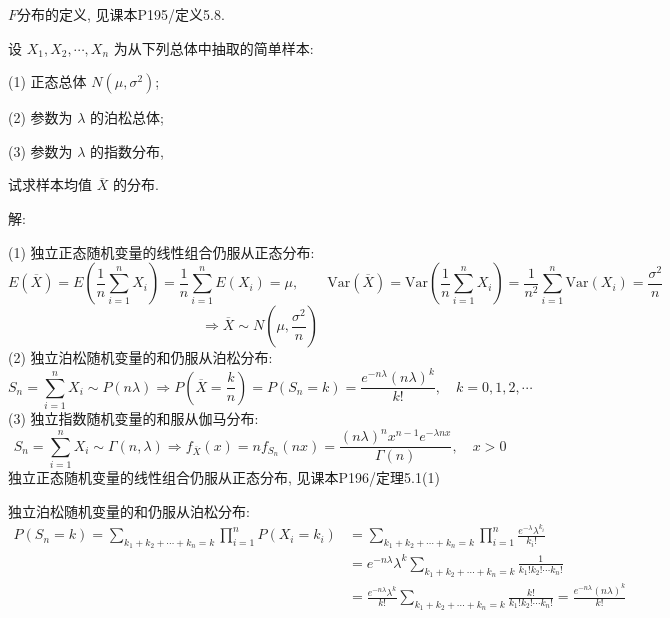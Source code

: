 \documentclass[standard]{ExBook}
\renewenvironment{shaded}{%
  \def\FrameCommand{\fboxsep=\FrameSep \colorbox{shadecolor}}%
  \MakeFramed{\advance\hsize-\width \FrameRestore}%
}{%
  \endMakeFramed
}
\begin{document}
\begin{qitems}
\textcolor{themeColor}{\selectfont {} $F$分布的定义, 见课本P195/定义5.8.}

\vspace{2.5cm-5em}

    \begin{bbox}
    \begin{shaded}
        \qitem
设 \( X_1, X_2, \cdots, X_n \) 为从下列总体中抽取的简单样本:

(1) 正态总体 \( N(\mu, \sigma^2) \);

(2) 参数为 \(\lambda\) 的泊松总体;

(3) 参数为 \(\lambda\) 的指数分布,

试求样本均值 \(\overline{X}\) 的分布.
    \end{shaded}
    \end{bbox}

\vspace{\dimexpr2.5cm-5em\relax}

解: 

(1) 独立正态随机变量的线性组合仍服从正态分布:
$$
E(\overline{X}) = E(\frac{1}{n}\sum\limits_{i=1}^{n}X_i) = \frac{1}{n}\sum\limits_{i=1}^{n}E(X_i) = \mu,
\qquad
\mathrm{Var}(\overline{X}) = \mathrm{Var}(\frac{1}{n}\sum\limits_{i=1}^{n}X_i) = \frac{1}{n^2}\sum\limits_{i=1}^{n}\mathrm{Var}(X_i) = \frac{\sigma^2}{n}
$$
$$
\Longrightarrow
\overline{X} \sim N\left(\mu, \frac{\sigma^2}{n}\right)
$$
(2) 独立泊松随机变量的和仍服从泊松分布:
$$
S_n = \sum\limits_{i=1}^{n}X_i \sim P(n\lambda)
\Longrightarrow
P(\overline{X}=\frac{k}{n}) = P(S_n=k) = \frac{e^{-n\lambda}(n\lambda)^k}{k!}, \quad k=0,1,2,\cdots
$$
(3) 独立指数随机变量的和服从伽马分布:
$$
S_n = \sum\limits_{i=1}^{n}X_i \sim \Gamma(n, \lambda)
\Longrightarrow
f_{\overline{X}}(x) = n f_{S_n}(nx) = \frac{(n\lambda)^n x^{n-1} e^{-\lambda n x}}{\Gamma(n)}, \quad x>0
$$
\textcolor{themeColor}{\selectfont {} 独立正态随机变量的线性组合仍服从正态分布, 见课本P196/定理5.1(1)}

\textcolor{themeColor}{\selectfont {} 独立泊松随机变量的和仍服从泊松分布:
$$
\begin{aligned}
P(S_n=k)
=
\sum\limits_{k_1+k_2+\cdots+k_n=k}\prod\limits_{i=1}^{n}P(X_i=k_i)
&=
\sum\limits_{k_1+k_2+\cdots+k_n=k}\prod\limits_{i=1}^{n}\frac{e^{-\lambda}\lambda^{k_i}}{k_i!}\\
&=
e^{-n\lambda}\lambda^k \sum\limits_{k_1+k_2+\cdots+k_n=k}\frac{1}{k_1!k_2!\cdots k_n!}\\
&=
\frac{e^{-n\lambda}\lambda^k}{k!} \sum\limits_{k_1+k_2+\cdots+k_n=k} \frac{k!}{k_1!k_2!\cdots k_n!}
=
\frac{e^{-n\lambda}(n\lambda)^k}{k!}
\end{aligned}
$$}


\end{qitems}
\end{document}
